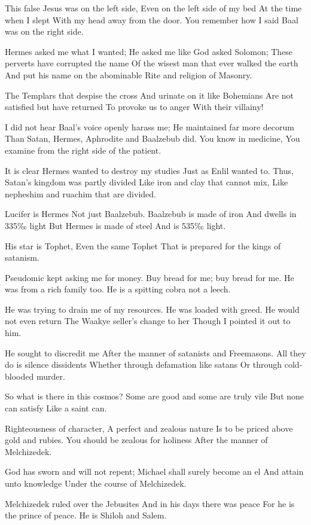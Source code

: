 \documentclass[
]{book}
\begin{document}
This false Jesus was on the left side,
Even on the left side of my bed
At the time when I slept
With my head away from the door.
You remember how I said Baal was on the right side.

Hermes asked me what I wanted;
He asked me like God asked Solomon;
These perverts have corrupted the name
Of the wisest man that ever walked the earth
And put his name on the abominable
Rite and religion of Masonry.

The Templars that despise the cross
And urinate on it like Bohemians
Are not satisfied but have returned
To provoke us to anger
With their villainy!

I did not hear Baal's voice openly harass me;
He maintained far more decorum
Than Satan, Hermes, Aphrodite and Baalzebub did.
You know in medicine,
You examine from the right side of the patient.

It is clear Hermes wanted to destroy my studies
Just as Enlil wanted to.
Thus, Satan's kingdom was partly divided
Like iron and clay that cannot mix,
Like nepheshim and ruachim that are divided.

Lucifer is Hermes
Not just Baalzebub.
Baalzebub is made of iron
And dwells in 335‰ light
But Hermes is made of steel
And is 535‰ light.

His star is Tophet,
Even the same Tophet
That is prepared for the kings of satanism.

Pseudomic kept asking me for money.
Buy bread for me; buy bread for me.
He was from a rich family too.
He is a spitting cobra not a leech.

He was trying to drain me of my resources.
He was loaded with greed.
He would not even return
The Waakye seller's change to her
Though I pointed it out to him.

He sought to discredit me
After the manner of satanists and Freemasons.
All they do is silence dissidents
Whether through defamation like satans
Or through cold-blooded murder.

So what is there in this cosmos?
Some are good and some are truly vile
But none can satisfy
Like a saint can.

Righteousness of character,
A perfect and zealous nature
Is to be priced above gold and rubies.
You should be zealous for holiness
After the manner of Melchizedek.

God has sworn and will not repent;
Michael shall surely become an el
And attain unto knowledge
Under the course of Melchizedek.

Melchizedek ruled over the Jebusites
And in his days there was peace
For he is the prince of peace.
He is Shiloh and Salem.
\end{document}
